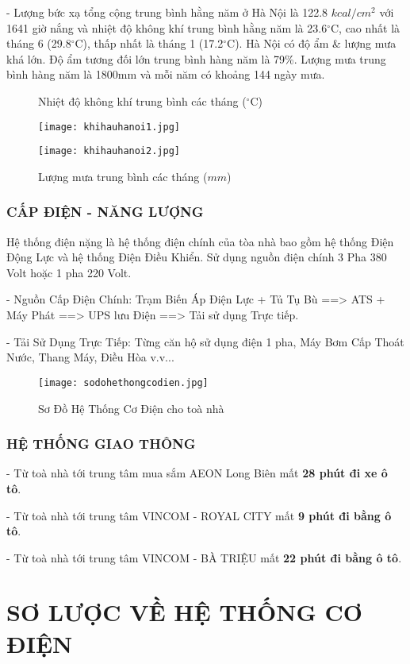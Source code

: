 	- Lượng bức xạ tổng cộng trung bình hằng năm ở Hà Nội là 122.8 $ kcal/cm^{2} $ với 1641 giờ nắng và nhiệt độ không khí trung bình hằng năm là 23.6$^{\circ}$C, cao nhất là tháng 6 (29.8$^{\circ}$C), thấp nhất là tháng 1 (17.2$^{\circ}$C). Hà Nội có độ ẩm \& lượng mưa khá lớn. Độ ẩm tương đối lớn trung bình hàng năm là 79\%. Lượng mưa trung bình hàng năm là 1800mm và mỗi năm có khoảng 144 ngày mưa.
	
\begin{figure}[H]
	\centering
	\caption{Nhiệt độ không khí trung bình các tháng ($^{\circ}$C)}
	\texttt{[image: khihauhanoi1.jpg]}
	\caption{Lượng mưa trung bình các tháng ($ mm $)}
	\texttt{[image: khihauhanoi2.jpg]}	
\end{figure}
	
	\subsection{CẤP ĐIỆN - NĂNG LƯỢNG}
	Hệ thống điện nặng là hệ thống điện chính của tòa nhà bao gồm hệ thống Điện Động Lực và hệ thống Điện Điều Khiển. Sử dụng nguồn điện chính 3 Pha 380 Volt hoặc 1 pha 220 Volt.
	
	- Nguồn Cấp Điện Chính:
	Trạm Biến Áp Điện Lực + Tủ Tụ Bù ==> ATS + Máy Phát ==> UPS lưu Điện ==> Tải sử dụng Trực tiếp.
	
	- Tải Sử Dụng Trực Tiếp: Từng căn hộ sử dụng điện 1 pha, Máy Bơm Cấp Thoát Nước, Thang Máy, Điều Hòa v.v...
	
	\begin{figure}[H]
		\centering
		\caption{Sơ Đồ Hệ Thống Cơ Điện cho toà nhà}
		\texttt{[image: sodohethongcodien.jpg]}
	\end{figure}
	
	\subsection{HỆ THỐNG GIAO THÔNG}
	- Từ toà nhà tới trung tâm mua sắm AEON Long Biên mất \textbf{28 phút đi xe ô tô}.
	
	- Từ toà nhà tới trung tâm VINCOM - ROYAL CITY mất \textbf{9 phút đi bằng ô tô}.
	
	- Từ toà nhà tới trung tâm VINCOM - BÀ TRIỆU mất \textbf{22 phút đi bằng ô tô}.
\newpage
{}

\newpage
\chapter{\textbf{SƠ LƯỢC VỀ HỆ THỐNG CƠ ĐIỆN}}
\newpage


